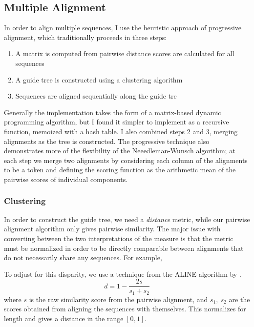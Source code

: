 \documentclass[doc,natbib]{apa6}
\begin{document}

\subsection{Multiple Alignment}

In order to align multiple sequences, I use the heuristic approach of progressive alignment, which traditionally proceeds in three steps: \begin{enumerate}
	\item A matrix is computed from pairwise distance scores are calculated for all sequences
	\item A guide tree is constructed using a clustering algorithm 
	\item Sequences are aligned sequentially along the guide tre
\end{enumerate}

Generally the implementation takes the form of a matrix-based dynamic programming algorithm, but I found it simpler to implement as a recursive function, memoized with a hash table. I also combined steps 2 and 3, merging alignments as the tree is constructed. The progressive technique also demonstrates more of the flexibility of the Neeedleman-Wunsch algorithm; at each step we merge two alignments by considering each column of the alignments to be a token and defining the scoring function as the arithmetic mean of the pairwise scores of individual components. 


\subsubsection{Clustering}

In order to construct the guide tree, we need a \emph{distance} metric, while our pairwise alignment algorithm only gives pairwise similarity. The major issue with converting between the two interpretations of the measure is that the metric must be normalized in order to be directly comparable between alignments that do not necessarily share any sequences. For example, 
%
%	

To adjust for this disparity, we use a technique from the ALINE algorithm by \citet{Downey2008}. 
\begin{equation}
d = 1- \frac{2s}{s_1+s_2}
\end{equation}
where $s$ is the raw similarity score from the pairwise alignment, and $s_1,\ s_2$ are the scores obtained from aligning the sequences with themselves. This normalizes for length and gives a distance in the range $[0,1]$. 
\end{document}
